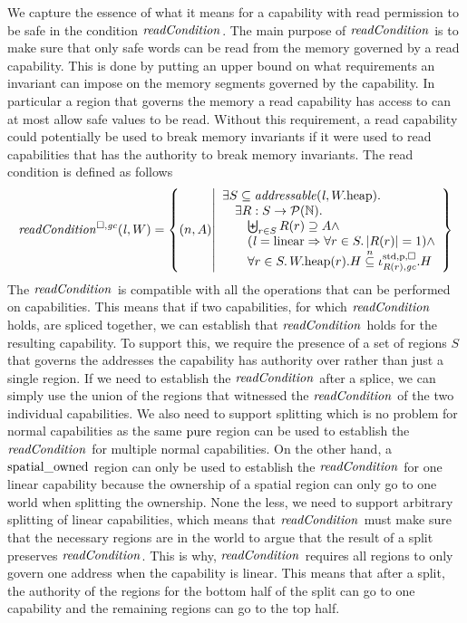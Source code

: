 \begin{jversion}
We capture the essence of what it means for a capability with read permission to be safe in the condition $\readCond[]{}$.
The main purpose of $\readCond[]{}$ is to make sure that only safe words can be read from the memory governed by a read capability.
This is done by putting an upper bound on what requirements an invariant can impose on the memory segments governed by the capability.
In particular a region that governs the memory a read capability has access to can at most allow safe values to be read.
Without this requirement, a read capability could potentially be used to break memory invariants if it were used to read capabilities that has the authority to break memory invariants.
The read condition is defined as follows
\[
  \readCond{\lin,W} = \left\{ \npair{A} \middle| 
    \begin{array}{l}
      \exists S \subseteq \addressable{\lin, \pwheap} \ldotp \\
      \quad \exists R : S \fun \powerset{\nats} \ldotp\\
      \qquad \biguplus_{r\in S} R(r) \supseteq A \wedge\\
      \qquad (\lin = \linear \Rightarrow \forall r \in S \ldotp |R(r)|  = 1) \wedge\\
      \qquad \forall r \in S \ldotp \pwheap(r).H \nsubeq \stdreg{R(r),\gc}{\pur}.H
    \end{array}
  \right\}
\]
The $\readCond[]{}$ is compatible with all the operations that can be performed on capabilities.
This means that if two capabilities, for which $\readCond[]{}$ holds, are spliced together, we can establish that $\readCond[]{}$ holds for the resulting capability.
To support this, we require the presence of a set of regions $S$ that governs the addresses the capability has authority over rather than just a single region.
If we need to establish the $\readCond[]{}$ after a splice, we can simply use the union of the regions that witnessed the $\readCond[]{}$ of the two individual capabilities.
We also need to support splitting which is no problem for normal capabilities as the same $\mathrm{pure}$ region can be used to establish the $\readCond[]{}$ for multiple normal capabilities.
On the other hand, a $\mathrm{spatial\_owned}$ region can only be used to establish the $\readCond[]{}$ for one linear capability because the ownership of a spatial region can only go to one world when splitting the ownership.
None the less, we need to support arbitrary splitting of linear capabilities, which means that $\readCond[]{}$ must make sure that the necessary regions are in the world to argue that the result of a split preserves $\readCond[]{}$.
This is why, $\readCond[]{}$ requires all regions to only govern one address when the capability is linear.
This means that after a split, the authority of the regions for the bottom half of the split can go to one capability and the remaining regions can go to the top half.


\end{jversion}
